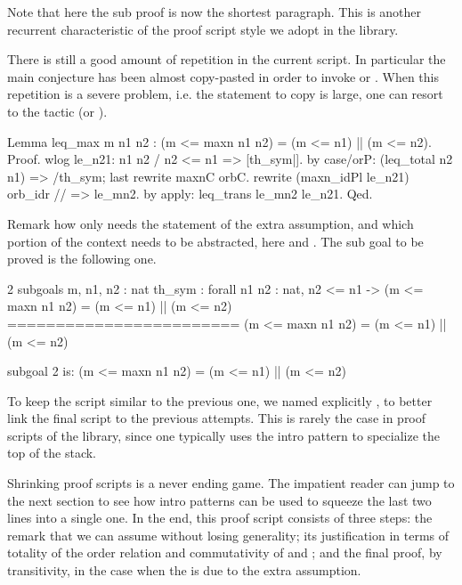 Note that here the sub proof is now the shortest paragraph.
This is another recurrent characteristic of the proof script style
we adopt in the \mcbMC{} library.

There is still a good amount of repetition in the current script.
In particular the main conjecture has been almost copy-pasted in
order to invoke  or .  When this repetition
is a severe problem, i.e. the statement to copy is large, one
can resort to the  tactic (or ).

\begin{coq}{}{}
Lemma leq_max m n1 n2 : (m <= maxn n1 n2) = (m <= n1) || (m <= n2).
Proof.
wlog le_n21: n1 n2 / n2 <= n1  => [th_sym|].
  by case/orP: (leq_total n2 n1) => /th_sym; last rewrite maxnC orbC.
rewrite (maxn_idPl le_n21) orb_idr // => le_mn2.
by apply: leq_trans le_mn2 le_n21.
Qed.
\end{coq}

Remark how  only needs the statement of the extra assumption,
and which portion of the context needs to be abstracted, here  and
.  The sub goal to be proved is the following one.

\begin{coqout}{}{}
2 subgoals
m, n1, n2 : nat
th_sym : forall n1 n2 : nat, n2 <= n1 ->
           (m <= maxn n1 n2) = (m <= n1) || (m <= n2)
========================
(m <= maxn n1 n2) = (m <= n1) || (m <= n2)


subgoal 2 is:
(m <= maxn n1 n2) = (m <= n1) || (m <= n2)
\end{coqout}

To keep the script similar to the previous one, we named explicitly
, to better link the final script to the previous attempts.
This is rarely the case in proof scripts of the library, since one typically
uses the  intro pattern to specialize the top of the stack.

Shrinking proof scripts is a never ending game.  The impatient reader can
jump to the next section to see
how intro patterns can be used to squeeze the last two lines into a
single one.  In the end, this proof script consists of three steps:
the remark that we can
assume  without losing generality; its justification in
terms of totality of the order relation and commutativity of 
and \C{||}; and the final proof, by transitivity, in the case when
the  is  due to the extra assumption.

